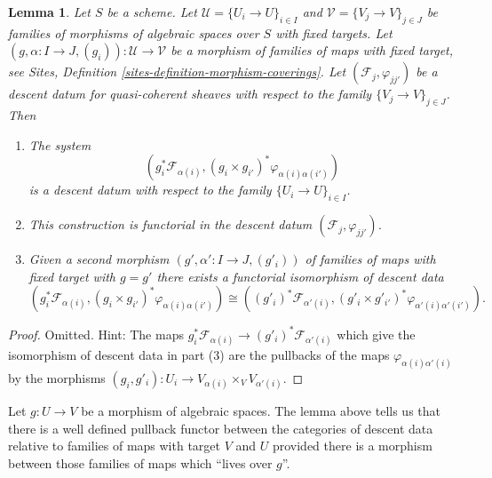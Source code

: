 \documentclass{stacks-project}
\theoremstyle{plain}
\newtheorem{lemma}[subsection]{Lemma}
\theoremstyle{definition}
\theoremstyle{remark}
\numberwithin{equation}{subsection}
\begin{document}
\begin{lemma}
\label{lemma-map-families}
Let $S$ be a scheme.
Let $\mathcal{U} = \{U_i \to U\}_{i \in I}$ and
$\mathcal{V} = \{V_j \to V\}_{j \in J}$
be families of morphisms of algebraic spaces over $S$ with fixed targets.
Let $(g, \alpha : I \to J, (g_i)) : \mathcal{U} \to \mathcal{V}$
be a morphism of families of maps with fixed target, see
Sites, Definition \ref{sites-definition-morphism-coverings}.
Let $(\mathcal{F}_j, \varphi_{jj'})$ be a descent
datum for quasi-coherent sheaves with respect to the
family $\{V_j \to V\}_{j \in J}$. Then
\begin{enumerate}
\item The system
$$
\left(g_i^*\mathcal{F}_{\alpha(i)},
(g_i \times g_{i'})^*\varphi_{\alpha(i)\alpha(i')}\right)
$$
is a descent datum with respect to the family $\{U_i \to U\}_{i \in I}$.
\item This construction is functorial in the descent datum
$(\mathcal{F}_j, \varphi_{jj'})$.
\item Given a second morphism
$(g', \alpha' : I \to J, (g'_i))$
of families of maps with fixed target
with $g = g'$ there exists a functorial isomorphism of descent data
$$
(g_i^*\mathcal{F}_{\alpha(i)},
(g_i \times g_{i'})^*\varphi_{\alpha(i)\alpha(i')})
\cong
((g'_i)^*\mathcal{F}_{\alpha'(i)},
(g'_i \times g'_{i'})^*\varphi_{\alpha'(i)\alpha'(i')}).
$$
\end{enumerate}
\end{lemma}

\begin{proof}
Omitted. Hint: The maps
$g_i^*\mathcal{F}_{\alpha(i)} \to (g'_i)^*\mathcal{F}_{\alpha'(i)}$
which give the isomorphism of descent data in part (3)
are the pullbacks of the maps $\varphi_{\alpha(i)\alpha'(i)}$ by the
morphisms $(g_i, g'_i) : U_i \to V_{\alpha(i)} \times_V V_{\alpha'(i)}$.
\end{proof}

\noindent
Let $g : U \to V$ be a morphism of algebraic spaces.
The lemma above tells us that there is a well defined pullback functor
between the categories of descent data relative to families of
maps with target $V$ and $U$ provided there is a morphism between those
families of maps which ``lives over $g$''.
\end{document}
